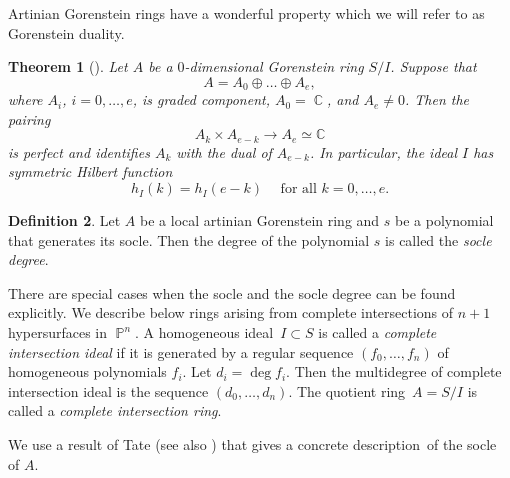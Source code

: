 \documentclass[a4paper,11pt,english,german]{amsart}
\DeclareMathOperator{\IP}{\mathbb{P}}
\DeclareMathOperator{\C}{\mathbb{C}}
\newtheorem{thm}{Theorem}[section]
\theoremstyle{definition}
\newtheorem{Def}[thm]{Definition}
\begin{document}
Artinian Gorenstein rings have a wonderful property which we will refer to as Gorenstein duality.

\begin{thm}[{\cite[Theorem 9.1]{huneke1999hyman}}]\label{gorenstein-duality}
Let $A$ be a $0$-dimensional Gorenstein ring $S/I$. Suppose that
$$A=A_0\oplus \dots \oplus A_e,$$
where $A_i$, $i=0,\dots, e$, is graded component, $A_0=\C$, and $A_e\neq 0$. Then
the pairing 
$$A_k \times A_{e-k}\to A_e\simeq \mathbb{C}$$
is perfect and identifies $A_k$ with the dual of $A_{e-k}$. In particular,
 the ideal $I$ has symmetric Hilbert function
\begin{equation*}
h_I(k)=h_I(e-k)\hspace{15pt}\text{for all }k=0,\dots,e.
\end{equation*}	
\end{thm}



\begin{Def}
	Let $A$ be a local artinian Gorenstein ring and $s$ be a polynomial that generates its socle. Then the degree of the polynomial $s$ is called the \emph{socle degree}.
\end{Def}

There are special cases when the socle and the socle degree can be found explicitly. We describe below rings arising from complete intersections of $n+1$ hypersurfaces in $\IP^n$. A homogeneous ideal~$I\subset S$ is called a \emph{complete intersection ideal} if it is generated by a regular sequence $(f_0,\dots, f_n)$ of homogeneous polynomials $f_i$. Let $d_i=\deg f_i$. Then the multidegree of complete intersection ideal is the sequence $(d_0,\dots, d_n)$. The quotient ring~$A=S/I$ is called a \emph{complete intersection ring}.




We use a result of Tate \cite[Theorem A.3(4)]{mazur1970local} (see also \cite{storch1975spurfunktionen}) that gives a concrete description~of the socle of $A$.
\end{document}
